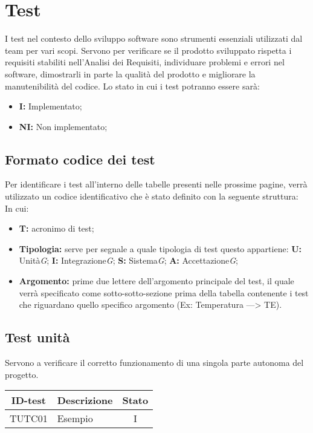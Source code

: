 \section{Test}
I test nel contesto dello sviluppo software sono strumenti essenziali utilizzati dal team per vari scopi. Servono per verificare se il prodotto sviluppato rispetta i requisiti stabiliti nell'Analisi dei Requisiti, individuare problemi e errori nel software, dimostrarli in parte la qualità del prodotto e migliorare la manutenibilità del codice.
Lo stato in cui i test potranno essere sarà:
\begin{itemize}
    \item \textbf{I:} Implementato;
    \item \textbf{NI:} Non implementato;
\end{itemize}
\subsection{Formato codice dei test}
Per identificare i test all’interno delle tabelle presenti nelle prossime pagine, verrà utilizzato un codice identificativo che è stato definito con la seguente struttura:
\\
In cui:
\begin{itemize}
    \item \textbf{T:} acronimo di test;
    \item \textbf{Tipologia:} serve per segnale a quale tipologia di test questo appartiene:
    \subitem \textbf{U:} Unità\textit{G};
    \subitem \textbf{I:} Integrazione\textit{G};
    \subitem \textbf{S:} Sistema\textit{G};
    \subitem \textbf{A:} Accettazione\textit{G};
    \item \textbf{Argomento:} prime due lettere dell’argomento principale del test, il quale verrà specificato come sotto-sotto-sezione prima della tabella contenente i test che riguardano quello specifico argomento (Ex: Temperatura —> TE). 
\end{itemize}
\subsection{Test unità}
Servono a verificare il corretto funzionamento di una singola parte autonoma del progetto.
\begin{tabular}{|c|p{4cm}|c|}
    \hline
    \textbf{ID-test} & \textbf{Descrizione} & \textbf{Stato} \\
    \hline
    TUTC01 & Esempio & I \\
    \hline
\end{tabular}
